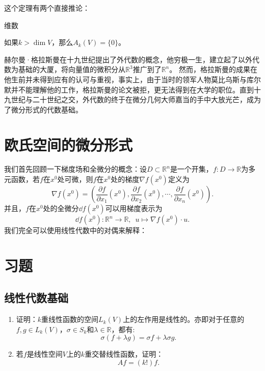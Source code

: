     这个定理有两个直接推论：

    维数

    如果\(k>\dim V\)，那么\(A_k(V) = \{0\}\)。

    赫尔曼·格拉斯曼在十九世纪提出了外代数的概念，他穷极一生，建立起了以外代数为基础的大厦，将向量值的微积分从\(\mathbb{R}^3\)推广到了\(\mathbb{R}^n\)。 然而，格拉斯曼的成果在他生前并未得到应有的认可与重视，事实上，由于当时的领军人物莫比乌斯与库尔默并不能理解他的工作，格拉斯曼的论文被拒，更无法得到在大学的职位。直到十九世纪与二十世纪之交，外代数的终于在微分几何大师嘉当的手中大放光芒，成为了微分形式的代数基础。

    
    \section{欧氏空间的微分形式}
    我们首先回顾一下梯度场和全微分的概念：设\(D \subset \mathbb{R}^n\)是一个开集，\enspace\(f: D \to \mathbb{R}\)为多元函数，若\(f\)在\(x^0\)处可微，则\(f\)在\(x^0\)处的梯度\(\nabla f(x^0)\)定义为\[\nabla f(x^0) = \left(\frac{\partial f}{\partial x_1}(x^0), \frac{\partial f}{\partial x_2}(x^0), \cdots, \frac{\partial f}{\partial x_n}(x^0)\right).\]
    并且，\enspace\(f\)在\(x^0\)处的全微分\(\dd f(x^0)\)可以用梯度表示为\[\dd f(x^0) : \mathbb{R}^n\to\mathbb{R},\enspace u\mapsto\nabla f(x^0)\cdot u.\]
    我们完全可以使用线性代数中的对偶来解释：


\section{习题}
    
    \subsection{线性代数基础}
    \begin{enumerate}
        \item 证明：\(k\)重线性函数的空间\(L_k(V)\)上的左作用是线性的。亦即对于任意的\(f,g\in L_k(V)\)，\enspace\(\sigma\in S_k\)和\(\lambda\in\mathbb{R}\)，都有:\[\sigma(f+\lambda g) = \sigma f+\lambda\sigma g.\]
        \item 若\(f\)是线性空间\(V\)上的\(k\)重交替线性函数，证明：\[Af = (k!)f.\]
    \end{enumerate}